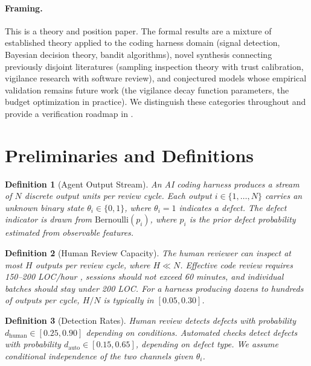 \documentclass[11pt, a4paper, copyright]{googledeepmind}
\newtheorem{definition}{Definition}[section]
\begin{document}
\paragraph{Framing.} This is a theory and position paper. The formal results are a mixture of established theory applied to the coding harness domain (signal detection, Bayesian decision theory, bandit algorithms), novel synthesis connecting previously disjoint literatures (sampling inspection theory with trust calibration, vigilance research with software review), and conjectured models whose empirical validation remains future work (the vigilance decay function parameters, the budget optimization in practice). We distinguish these categories throughout and provide a verification roadmap in .

\section{Preliminaries and Definitions}
\label{sec:prelim}

\begin{definition}[Agent Output Stream]
\label{def:output-stream}
An AI coding harness produces a stream of $N$ discrete output units per review cycle. Each output $i \in \{1, \ldots, N\}$ carries an unknown binary state $\theta_i \in \{0, 1\}$, where $\theta_i = 1$ indicates a defect. The defect indicator is drawn from $\text{Bernoulli}(p_i)$, where $p_i$ is the prior defect probability estimated from observable features.
\end{definition}

\begin{definition}[Human Review Capacity]
\label{def:capacity}
The human reviewer can inspect at most $H$ outputs per review cycle, where $H \ll N$. Effective code review requires 150--200 LOC/hour \citep{fagan1976design, cohen2006best}, sessions should not exceed 60 minutes, and individual batches should stay under 200 LOC. For a harness producing dozens to hundreds of outputs per cycle, $H/N$ is typically in $[0.05, 0.30]$.
\end{definition}

\begin{definition}[Detection Rates]
\label{def:detection}
Human review detects defects with probability $d_{\text{human}} \in [0.25, 0.90]$ depending on conditions. Automated checks detect defects with probability $d_{\text{auto}} \in [0.15, 0.65]$, depending on defect type. We assume conditional independence of the two channels given $\theta_i$.
\end{definition}
\end{document}
